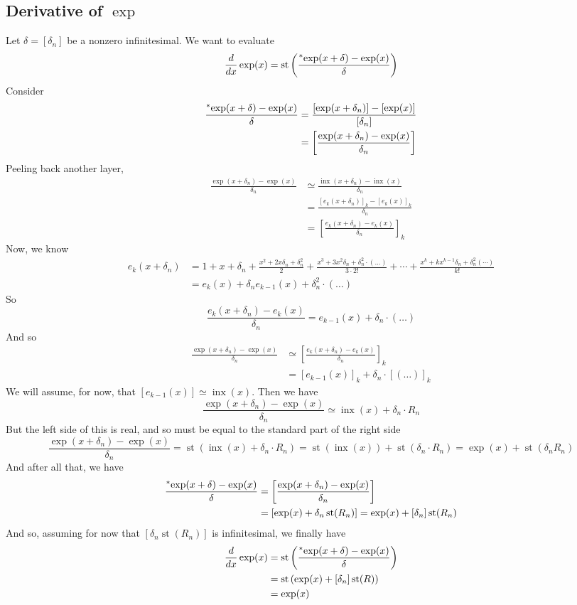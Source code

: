 \documentclass{article}
\newcommand{\stp}[1]{\st\left(#1\right)}
\newcommand{\hr}[1]{\prescript{*}{}{#1}}
\DeclareMathOperator{\st}{st}
\DeclareMathOperator{\inx}{inx}
\theoremstyle{definition}
\begin{document}
\subsection{Derivative of $\exp$}

Let $\delta = [\delta_n]$ be a nonzero infinitesimal. We want to evaluate
\[\frac{d}{dx}\exp(x) = \stp{\frac{\hr{\exp}(x + \delta) - \exp(x)}{\delta}}\]
Consider
\begin{align*}
    \frac{\hr{\exp}(x + \delta) - \exp(x)}{\delta} &= \frac{[\exp(x + \delta_n)] - [\exp(x)]}{[\delta_n]} \\
    &= \left[\frac{\exp(x + \delta_n) - \exp(x)}{\delta_n}\right]
\end{align*}
Peeling back another layer,
\begin{align*}
    \frac{\exp(x + \delta_n) - \exp(x)}{\delta_n} &\simeq \frac{\inx(x+\delta_n)-\inx(x)}{\delta_n} \\
    &= \frac{[e_k(x+\delta_n)]_k - [e_k(x)]_k}{\delta_n} \\
    &= \left[\frac{e_k(x+\delta_n) - e_k(x)}{\delta_n}\right]_k
\end{align*}
Now, we know
\begin{align*}
    e_k(x + \delta_n) &= 1 + x + \delta_n + \frac{x^2 + 2x\delta_n + \delta_n^2}{2} + \frac{x^3 + 3x^2\delta_n + \delta_n^2 \cdot (\ldots)}{3\cdot 2!} + \cdots + \frac{x^k + kx^{k-1}\delta_n + \delta_n^2(\cdots)}{k!}\\
    &= e_k(x) + \delta_n e_{k-1}(x) + \delta_n^2 \cdot (\ldots)
\end{align*}
So
\[ \frac{e_k(x+\delta_n) - e_k(x)}{\delta_n} = e_{k-1}(x) + \delta_n \cdot (\ldots) \]
And so
\begin{align*}
    \frac{\exp(x + \delta_n) - \exp(x)}{\delta_n} &\simeq \left[\frac{e_k(x+\delta_n) - e_k(x)}{\delta_n}\right]_k \\
    &= [e_{k-1}(x)]_k + \delta_n \cdot [(\ldots)]_k
\end{align*}
We will assume, for now, that $[e_{k-1}(x)] \simeq \inx(x)$. Then we have
\[ \frac{\exp(x + \delta_n) - \exp(x)}{\delta_n} \simeq \inx(x) + \delta_n \cdot R_n \]
But the left side of this is real, and so must be equal to the standard part of the right side
\[ \frac{\exp(x + \delta_n) - \exp(x)}{\delta_n} = \stp{\inx(x) + \delta_n \cdot R_n} = \st(\inx(x)) + \st(\delta_n \cdot R_n) = \exp(x) + \st(\delta_n R_n) \]
And after all that, we have
\begin{align*}
    \frac{\hr{\exp}(x + \delta) - \exp(x)}{\delta} &= \left[\frac{\exp(x + \delta_n) - \exp(x)}{\delta_n}\right] \\
    &= [\exp(x) + \delta_n \st(R_n)] = \exp(x) + [\delta_n] \st(R_n)
\end{align*}
And so, assuming for now that $[\delta_n \st(R_n)]$ is infinitesimal, we finally have
\begin{align*}
    \frac{d}{dx}\exp(x) &= \stp{\frac{\hr{\exp}(x + \delta) - \exp(x)}{\delta}} \\
    &= \stp{\exp(x) + [\delta_n] \st(R)} \\
    &= \exp(x)
\end{align*}
\pagebreak
\end{document}
